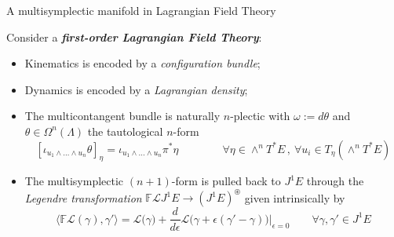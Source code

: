 \documentclass[10pt]{beamer}
\begin{document}
\begin{frame}[fragile]{A multisymplectic manifold in Lagrangian Field Theory}\label{frame:GIMMSY_construction}
	\begin{center}
		
	\end{center}	
	\vfill
	
	Consider a \emph{\bf{first-order Lagrangian Field Theory}}:
	\begin{itemize}
		\item<1-> {\color{blue} Kinematics} is encoded by a {\color{blue} \emph{configuration bundle}};
		\item<2-> {\color{red} Dynamics} is encoded by a {\color{red} \emph{Lagrangian density}};
		\item<3-> The {\color{orange} multicontangent bundle} is naturally $n$-plectic with $\omega := d \theta$ and \\
		$\theta \in \Omega^n(\Lambda)$ the tautological $n$-form
		{\small
		\begin{displaymath}
			\left[ \iota_{u_1 \wedge \ldots \wedge u_n} \theta \right]_\eta 
			= \iota_{u_1 \wedge \ldots \wedge u_n} \pi^\ast \eta 
			\qquad \qquad \forall \eta \in \wedge^n T^* E \, , \: \forall u_i \in T_\eta (\wedge^n T^* E) 		
		\end{displaymath}
		}
		\item<4-> The multisymplectic $(n+1)$-form is pulled back to $J^1 E$ through the \emph{Legendre transformation} $\mathbb{F}\mathcal{L} J^1 E \to (J^1 E)^\circledast$
    given intrinsically by
    {\small
		\begin{displaymath}
        		\Big\langle \mathbb{F}\mathcal{L}(\gamma),\gamma'\Big\rangle=
        		\mathcal{L}\Big(\gamma\Big) + \frac{ d}{ d \epsilon}\mathcal{L}\Big(\gamma +\epsilon(\gamma'-\gamma)\Big)\Bigg\vert_{\epsilon=0} \qquad \forall \gamma,\gamma' \in J^1 E
    		\end{displaymath}
    }

	\end{itemize}
	\vfill
	\hfill {}%
\end{frame}
\end{document}
